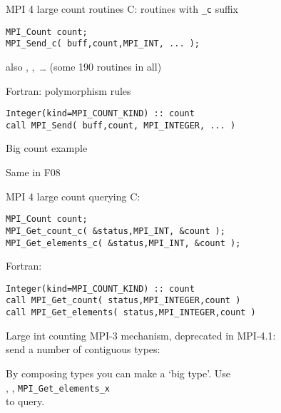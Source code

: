 \begin{numberedframe}{MPI 4 large count routines}
C: routines with \lstinline+_c+ suffix
\begin{lstlisting}
MPI_Count count;
MPI_Send_c( buff,count,MPI_INT, ... );
\end{lstlisting}
\lstset{language=Fortran}
also , ,~\ldots
(some 190 routines in all)

Fortran: polymorphism rules
\begin{lstlisting}
Integer(kind=MPI_COUNT_KIND) :: count
call MPI_Send( buff,count, MPI_INTEGER, ... )
\end{lstlisting}
\lstset{language=C}
\end{numberedframe}

\begin{numberedframe}{Big count example}
\end{numberedframe}

\begin{numberedframe}{Same in F08}
\end{numberedframe}


\begin{numberedframe}{MPI 4 large count querying}
C: 
\begin{lstlisting}
MPI_Count count;
MPI_Get_count_c( &status,MPI_INT, &count );
MPI_Get_elements_c( &status,MPI_INT, &count );
\end{lstlisting}
\lstset{language=Fortran}
Fortran: 
\begin{lstlisting}
Integer(kind=MPI_COUNT_KIND) :: count
call MPI_Get_count( status,MPI_INTEGER,count )
call MPI_Get_elements( status,MPI_INTEGER,count )
\end{lstlisting}
\lstset{language=C}
\end{numberedframe}

\begin{numberedframe}{Large int counting}
  MPI-3 mechanism, deprecated in MPI-4.1:\\
  send a number of contiguous types:


  By composing types you can make a `big type'. Use\\
  ,
  ,
   \lstinline{MPI_Get_elements_x}\\
  to query.

\end{numberedframe}

